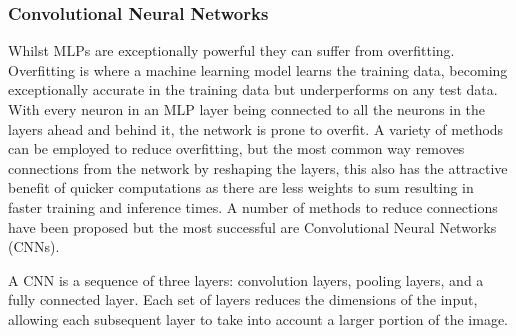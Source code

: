 \subsubsection{Convolutional Neural Networks}
\label{sec:cnns}

Whilst MLPs are exceptionally powerful they can suffer from overfitting. Overfitting is where a machine learning model learns the training data, becoming exceptionally accurate in the training data but underperforms on any test data. With every neuron in an MLP layer being connected to all the neurons in the layers ahead and behind it, the network is prone to overfit\cite{o2015introduction}. A variety of methods can be employed to reduce overfitting, but the most common way removes connections from the network by reshaping the layers, this also has the attractive benefit of quicker computations as there are less weights to sum resulting in faster training and inference times. A number of methods to reduce connections have been proposed but the most successful are Convolutional Neural Networks (CNNs).

A CNN is a sequence of three layers: convolution layers, pooling layers, and a fully connected layer\cite{ibmconvolutional}. Each set of layers reduces the dimensions of the input, allowing each subsequent layer to take into account a larger portion of the image.

